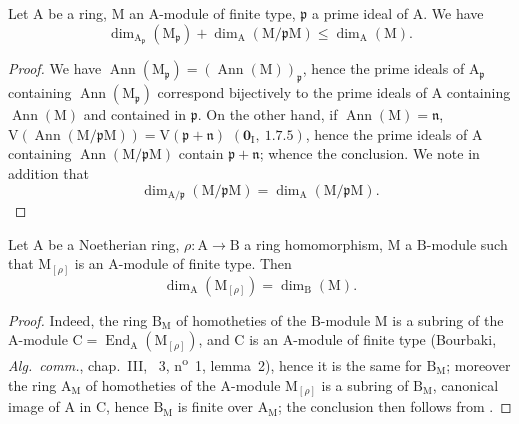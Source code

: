\begin{proposition}[16.1.8]
\label{0.16.1.8}
Let $\mathrm{A}$ be a ring, $\mathrm{M}$ an $\mathrm{A}$-module of finite type, $\mathfrak{p}$ a prime ideal of $\mathrm{A}$.
We have
\begin{equation}
\label{0.16.1.8.1}
\tag{16.1.8.1}
  \dim_{\mathrm{A}_\mathfrak{p}}(\mathrm{M}_\mathfrak{p})+\dim_\mathrm{A}(\mathrm{M}/\mathfrak{p}\mathrm{M})\leq\dim_\mathrm{A}(\mathrm{M}).
\end{equation}
\end{proposition}

\begin{proof}
We have $\operatorname{Ann}(\mathrm{M}_\mathfrak{p})=(\operatorname{Ann}(\mathrm{M}))_\mathfrak{p}$, hence the prime ideals of $\mathrm{A}_\mathfrak{p}$ containing $\operatorname{Ann}(\mathrm{M}_\mathfrak{p})$ correspond bijectively to the prime ideals of $\mathrm{A}$ containing $\operatorname{Ann}(\mathrm{M})$ and contained in $\mathfrak{p}$.
On the other hand, if $\operatorname{Ann}(\mathrm{M})=\mathfrak{n}$, $\mathrm{V}(\operatorname{Ann}(\mathrm{M}/\mathfrak{p}\mathrm{M}))=\mathrm{V}(\mathfrak{p}+\mathfrak{n})$ $(\mathbf{0}_\mathrm{I},~1.7.5)$, hence the prime ideals of $\mathrm{A}$ containing $\operatorname{Ann}(\mathrm{M}/\mathfrak{p}\mathrm{M})$ contain $\mathfrak{p}+\mathfrak{n}$; whence the conclusion.
We note in addition that
\begin{equation}
\label{0.16.1.8.2}
\tag{16.1.8.2}
  \dim_{\mathrm{A}/\mathfrak{p}}(\mathrm{M}/\mathfrak{p}\mathrm{M})=\dim_\mathrm{A}(\mathrm{M}/\mathfrak{p}\mathrm{M}).
\end{equation}
\end{proof}

\begin{proposition}[16.1.9]
\label{0.16.1.9}
Let $\mathrm{A}$ be a Noetherian ring, $\rho:\mathrm{A}\to\mathrm{B}$ a ring homomorphism, $\mathrm{M}$ a $\mathrm{B}$-module such that $\mathrm{M}_{[\rho]}$ is an $\mathrm{A}$-module of finite type.
Then
\begin{equation}
\label{0.16.1.9.1}
\tag{16.1.9.1}
  \dim_\mathrm{A}(\mathrm{M}_{[\rho]})=\dim_\mathrm{B}(\mathrm{M}).
\end{equation}
\end{proposition}

\begin{proof}
Indeed, the ring $\mathrm{B}_\mathrm{M}$ of homotheties of the $\mathrm{B}$-module $\mathrm{M}$ is a subring of the $\mathrm{A}$-module $\mathrm{C}=\operatorname{End}_\mathrm{A}(\mathrm{M}_{[\rho]})$, and $\mathrm{C}$ is an $\mathrm{A}$-module of finite type (Bourbaki, \emph{Alg.~comm.}, chap.~III, \textsection~3, n\textsuperscript{o}~1, lemma~2), hence it is the same for $\mathrm{B}_\mathrm{M}$; moreover the ring $\mathrm{A}_\mathrm{M}$ of homotheties of the $\mathrm{A}$-module $\mathrm{M}_{[\rho]}$ is a subring of $\mathrm{B}_\mathrm{M}$, canonical image of $\mathrm{A}$ in $\mathrm{C}$, hence $\mathrm{B}_\mathrm{M}$ is finite over $\mathrm{A}_\mathrm{M}$; the conclusion then follows from .
\end{proof}

